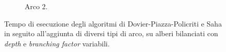 \begin{figure}[h!]
{\begin{subfigure}[b]{0.5\textwidth}
            \caption{Arco 2.}
            \label{fig:saha_2_result}
        \end{subfigure}
    }
    \caption{Tempo di esecuzione degli algoritmi di Dovier-Piazza-Policriti e Saha in seguito all'aggiunta di diversi tipi di arco, su alberi bilanciati con \emph{depth} e \emph{branching factor} variabili.}
\end{figure}

